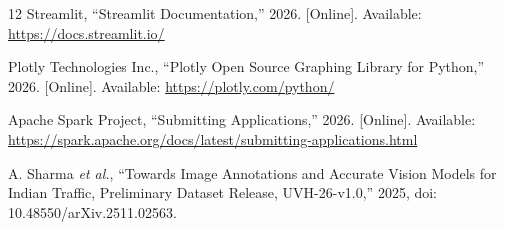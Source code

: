 \documentclass[journal,onecolumn]{IEEEtran}
\begin{document}
\begin{thebibliography}{12}
Streamlit, ``Streamlit Documentation,'' 2026. [Online]. Available: \url{https://docs.streamlit.io/}

Plotly Technologies Inc., ``Plotly Open Source Graphing Library for Python,'' 2026. [Online]. Available: \url{https://plotly.com/python/}

Apache Spark Project, ``Submitting Applications,'' 2026. [Online]. Available: \url{https://spark.apache.org/docs/latest/submitting-applications.html}

A. Sharma \emph{et al.}, ``Towards Image Annotations and Accurate Vision Models for Indian Traffic, Preliminary Dataset Release, UVH-26-v1.0,'' 2025, doi: 10.48550/arXiv.2511.02563.

\end{thebibliography}
\end{document}
